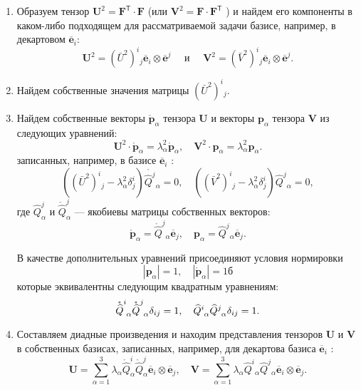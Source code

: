 \begin{enumerate}
  \item Образуем тензор $\mathbf{U}^{2}=\mathbf{F}^{\mathsf{T}} \cdot
\mathbf{F}$ (или $\mathbf{V}^{2}=\mathbf{F} \cdot \mathbf{F}^{\mathsf{T}}$ ) и
найдем его компоненты в каком-либо подходящем для рассматриваемой задачи базисе,
например, в декартовом $\overline{\mathbf{e}}_{i}$:
\[
\mathbf{U}^{2}=\left(\bar{U}^{2}\right)^{i}{ }_{j} \overline{\mathbf{e}}_{i} \otimes \overline{\mathbf{e}}^{j} \quad \text { и } \quad \mathbf{V}^{2}=\left(\bar{V}^{2}\right)^{i}{ }_{j} \overline{\mathbf{e}}_{i} \otimes \overline{\mathbf{e}}^{j} .
\]

  \item Найдем собственные значения матрицы $\left(\bar{U}^{2}\right)^{i}{
    }_{j}$.

\item Найдем собственные векторы $\mathring{\mathbf{p}}_{\alpha}$ тензора $\mathbf{U}$ и векторы $\mathbf{p}_{\alpha}$ тензора $\mathbf{V}$ из следующих уравнений:
\[
\mathbf{U}^{2} \cdot \mathring{\mathbf{p}}_{\alpha}=\lambda_{\alpha}^{2}
\mathring{\mathbf{p}}_{\alpha}, \quad \mathbf{V}^{2} \cdot
\mathbf{p}_{\alpha}=\lambda_{\alpha}^{2} \mathbf{p}_{\alpha}.
\]
записанных, например, в базисе $\overline{\mathbf{e}}_{i}$ :
\[
\left(\left(\bar{U}^{2}\right)^{i}{ }_{j}-\lambda_{\alpha}^{2}
\delta_{j}^{i}\right) \mathring{\widehat{Q}^{j}}{ }_{\alpha}=0,
\quad\left(\left(\bar{V}^{2}\right)^{i}{ }_{j}-\lambda_{\alpha}^{2}
\delta_{j}^{i}\right) \widehat{Q}^{j}{ }_{\alpha}=0, 
\]
где $\widehat{Q}^{j}_{\alpha}$ и $\mathring{\widehat{Q}}^{j}_{\alpha}$ --- якобиевы матрицы собственных векторов:
\[
  \mathring{\mathbf{p}}_{\alpha}=\mathring{\widehat{Q}}^{j}{ }_{\alpha}
  \overline{\mathbf{e}}_{j}, \quad \mathbf{p}_{\alpha}=\widehat{Q}^{j}{
  }_{\alpha} \overline{\mathbf{e}}_{j}.
\]

В
качестве дополнительных уравнений присоединяют условия нормировки
\[
\left|\mathbf{p}_{\alpha}\right|=1,
\quad\left|\mathring{\mathbf{p}}_{\alpha}\right|=1б
\]
которые эквивалентны следующим квадратным уравнениям: 
\[
  \tensor{\mathring{\widehat{Q}}}{^i_\alpha}
  \tensor{\mathring{\widehat{Q}}}{^j_\alpha} \delta_{ij} = 1, \quad
  \tensor{\widehat{Q}}{^i_\alpha} \tensor{\widehat{Q}}{^j_\alpha}\delta_{ij}=1.
\]

  \item Составляем диадные произведения и находим представления тензоров $
    \mathbf{U} $ и $ \mathbf{V} $ в собственных базисах, записанных, например, для декартова базиса $\overline{\mathbf{e}}_{i}$ :
\[
  \mathbf{U}=\sum_{\alpha=1}^{3} \lambda_{\alpha}
  \mathring{\widehat{Q}}^{i}_{\alpha} \mathring{\widehat{Q}}^{j}_{\alpha}
\overline{\mathbf{e}}_{i} \otimes \overline{\mathbf{e}}_{j}, \quad
\mathbf{V}=\sum_{\alpha=1}^{3} \lambda_{\alpha} \widehat{Q}^{i}{ }_{\alpha}
\widehat{Q}^{j}{ }_{\alpha} \overline{\mathbf{e}}_{i} \otimes
\overline{\mathbf{e}}_{j} . 
\]
\end{enumerate}

